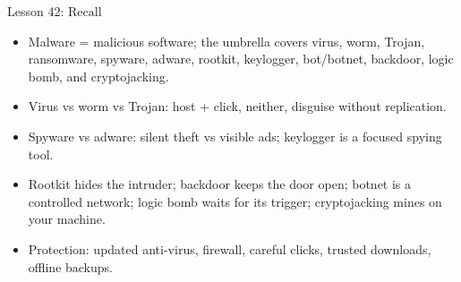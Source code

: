 \documentclass[aspectratio=169]{beamer}
\begin{document}
\begin{frame}{Lesson 42: Recall}
  \begin{itemize}
    \item Malware = malicious software; the umbrella covers virus, worm,
      Trojan, ransomware, spyware, adware, rootkit, keylogger, bot/botnet,
      backdoor, logic bomb, and cryptojacking.
    \item Virus vs worm vs Trojan: host + click, neither, disguise without
      replication.
    \item Spyware vs adware: silent theft vs visible ads; keylogger is a
      focused spying tool.
    \item Rootkit hides the intruder; backdoor keeps the door open; botnet is
      a controlled network; logic bomb waits for its trigger; cryptojacking
      mines on your machine.
    \item Protection: updated anti-virus, firewall, careful clicks, trusted
      downloads, offline backups.
  \end{itemize}
\end{frame}
\end{document}
